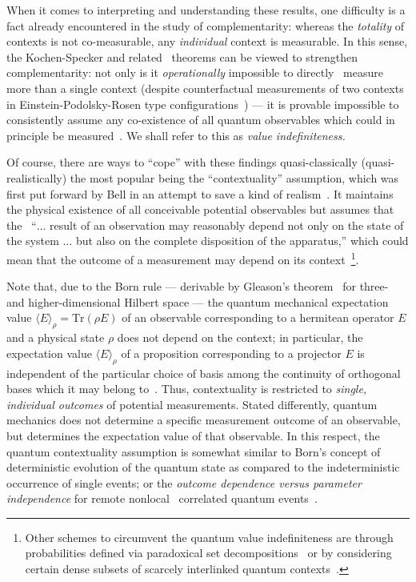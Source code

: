 \documentclass[10pt]{article}%
\begin{document}
When it comes to interpreting and understanding these results, one difficulty  is a fact
already encountered in the study of complementarity:
whereas the {\em totality} of contexts is not co-measurable,
any {\em individual} context is measurable.
In this sense,
the Kochen-Specker and related~\cite{ghz,mermin-93}
theorems  can be viewed to strengthen complementarity:  not only
is it {\em operationally} impossible to directly~\cite{svozil-2006-uniquenessprinciple} measure
more than a single context (despite counterfactual measurements of two contexts
in Einstein-Podolsky-Rosen type configurations~\cite{epr,svozil-2006-omni}) ---
it is provable impossible to consistently assume any co-existence of all quantum observables
which could in principle be measured~\cite{peres222}. We shall refer to this as {\em value indefiniteness.}

Of course, there are ways to ``cope'' with these findings quasi-classically (quasi-realistically)
the most popular being the ``contextuality''
assumption, which was first put forward by Bell
in an attempt to save a kind of realism~\cite{bohr-1949,bell-66,hey-red,redhead}.
It maintains the physical existence of all conceivable potential observables but assumes that the~\cite{bell-66}
``$\ldots$
result of an observation may reasonably depend
not only on the state of the system  $\ldots$
but also on the complete disposition  of the apparatus,''
which could mean that the outcome of a measurement may depend on its context~\footnote{Other schemes to circumvent the quantum value indefiniteness are through
probabilities defined via paradoxical set decompositions~\cite{pitowsky-82,pitowsky-83}
or by considering certain dense subsets of scarcely interlinked quantum contexts~\cite{meyer:99}.}.

Note that, due to the Born rule --- derivable by Gleason's theorem~\cite{Gleason,r:dvur-93,pitowsky:218} for three- and higher-dimensional Hilbert space ---
the quantum mechanical expectation value $\langle E\rangle_\rho =\textrm{Tr} \left(\rho E\right)$ of an observable corresponding to a hermitean operator $E$
and a physical state $\rho$
does not depend on the context; in particular,  the expectation value $\langle E\rangle_\rho$  of a proposition corresponding to a projector $E$
is independent of the particular choice of basis among the continuity of orthogonal bases which it may belong to~\cite{svozil:040102}.
Thus, contextuality is restricted to {\em single, individual outcomes} of potential measurements.
Stated differently, quantum mechanics does not determine a specific measurement outcome of an observable,
but  determines the expectation value of that observable.
In this respect, the quantum contextuality assumption is somewhat similar to Born's concept of deterministic evolution of the quantum state as compared to the
indeterministic occurrence of single events; or the {\em outcome dependence {\it versus} parameter independence}
for remote nonlocal~\cite{wjswz-98} correlated quantum events~\cite{shimony2}.
\end{document}
